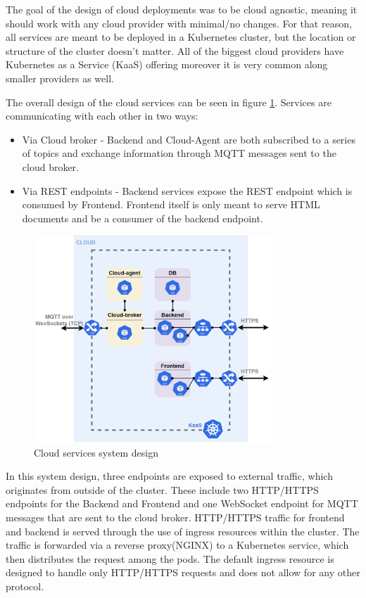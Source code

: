 The goal of the design of cloud deployments was to be cloud agnostic, meaning it should work with any cloud provider with minimal/no changes. For that reason, all services are meant to be deployed in a Kubernetes cluster, but the location or structure of the cluster doesn't matter. All of the biggest cloud providers have Kubernetes as a Service (KaaS) offering moreover it is very common along smaller providers as well.

The overall design of the cloud services can be seen in figure \ref{fig:cloud_services}. Services are communicating with each other in two ways:
\begin{itemize}
    \item Via Cloud broker - Backend and Cloud-Agent are both subscribed to a series of topics and exchange information through MQTT messages sent to the cloud broker. 
    \item Via REST endpoints - Backend services expose the REST endpoint which is consumed by Frontend. Frontend itself is only meant to serve HTML documents and be a consumer of the backend endpoint.
\end{itemize}

\begin{figure}[H]
    \centering
    \includegraphics[width=0.8\textwidth]{pictures/cloud_services.png}
    \caption{ Cloud services system design }
    \label{fig:cloud_services}
\end{figure}

In this system design, three endpoints are exposed to external traffic, which originates from outside of the cluster. These include two HTTP/HTTPS endpoints for the Backend and Frontend and one WebSocket endpoint for MQTT messages that are sent to the cloud broker. HTTP/HTTPS traffic for frontend and backend is served through the use of ingress resources within the cluster. The traffic is forwarded via a reverse proxy(NGINX) to a Kubernetes service, which then distributes the request among the pods. The default ingress resource is designed to handle only HTTP/HTTPS requests and does not allow for any other protocol.


